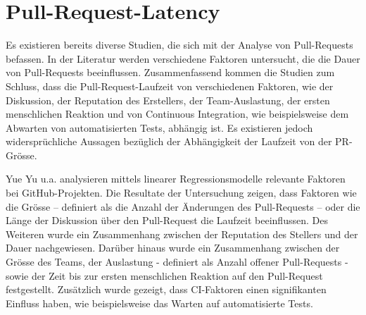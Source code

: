 \section{Pull-Request-Latency}
\label{sec:PullRequestDauer}
Es existieren bereits diverse Studien, die sich mit der Analyse von Pull-Requests befassen. In der Literatur werden verschiedene Faktoren untersucht, die die Dauer von Pull-Requests beeinflussen. Zusammenfassend kommen die Studien zum Schluss, dass die Pull-Request-Laufzeit von verschiedenen Faktoren, wie der Diskussion, der Reputation des Erstellers, der Team-Auslastung, der ersten menschlichen Reaktion und von Continuous Integration, wie beispielsweise dem Abwarten von automatisierten Tests, abhängig ist. Es existieren jedoch widersprüchliche Aussagen bezüglich der Abhängigkeit der Laufzeit von der PR-Grösse. \parencite{yu_wait_2015}\parencite{hasan_understanding_2023}\parencite{kudrjavets_small_2022}\parencite{bernardo_studying_2018}

Yue Yu u.a.\parencite{yu_wait_2015} analysieren mittels linearer Regressionsmodelle relevante Faktoren bei GitHub-Projekten. Die Resultate der Untersuchung zeigen, dass Faktoren wie die Grösse – definiert als die Anzahl der Änderungen des Pull-Requests – oder die Länge der Diskussion über den Pull-Request die Laufzeit beeinflussen. Des Weiteren wurde ein Zusammenhang zwischen der Reputation des Stellers und der Dauer nachgewiesen. Darüber hinaus wurde ein Zusammenhang zwischen der Grösse des Teams, der Auslastung - definiert als Anzahl offener Pull-Requests - sowie der Zeit bis zur ersten menschlichen Reaktion auf den Pull-Request festgestellt. Zusätzlich wurde gezeigt, dass CI-Faktoren einen signifikanten Einfluss haben, wie beispielsweise das Warten auf automatisierte Tests.~\parencite{yu_wait_2015}

